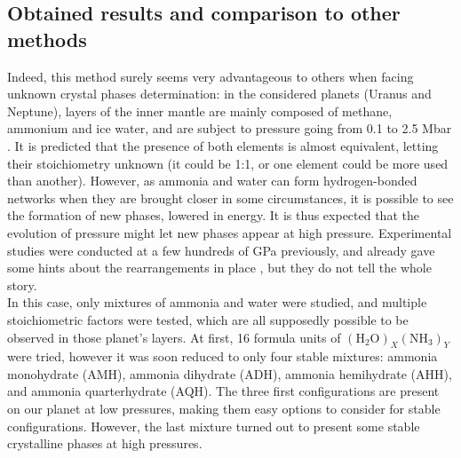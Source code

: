 \documentclass[11pt]{article}
\begin{document}
\begin{multicols}{2}
\section*{Obtained results and comparison to other methods}
Indeed, this method surely seems very advantageous to others when facing unknown crystal phases determination: in the considered planets (Uranus and Neptune), layers of the inner mantle are mainly composed of methane, ammonium and ice water, and are subject to pressure going from 0.1 to 2.5 Mbar \cite{https://doi.org/10.1029/JB085iB01p00225}. It is predicted that the presence of both elements is almost equivalent, letting their stoichiometry unknown (it could be 1:1, or one element could be more used than another). However, as ammonia and water can form hydrogen-bonded networks when they are brought closer in some circumstances, it is possible to see the formation of new phases, lowered in energy. It is thus expected that the evolution of pressure might let new phases appear at high pressure. Experimental studies were conducted at a few hundreds of GPa previously, and already gave some hints about the rearrangements in place \cite{experimental}, but they do not tell the whole story.\\
In this case, only mixtures of ammonia and water were studied, and multiple stoichiometric factors were tested, which are all supposedly possible to be observed in those planet's layers. At first, 16 formula units of $( \mathrm{H}_2\mathrm{O})_{X}(\mathrm{N}\mathrm{H}_3)_{Y}$ were tried, however it was soon reduced to only four stable mixtures: ammonia monohydrate (AMH), ammonia dihydrate (ADH), ammonia hemihydrate (AHH), and ammonia quarterhydrate (AQH). The three first configurations are present on our planet at low pressures, making them easy options to consider for stable configurations. However, the last mixture turned out to present some stable crystalline phases at high pressures.\vspace{1em}


\end{multicols}
\end{document}

